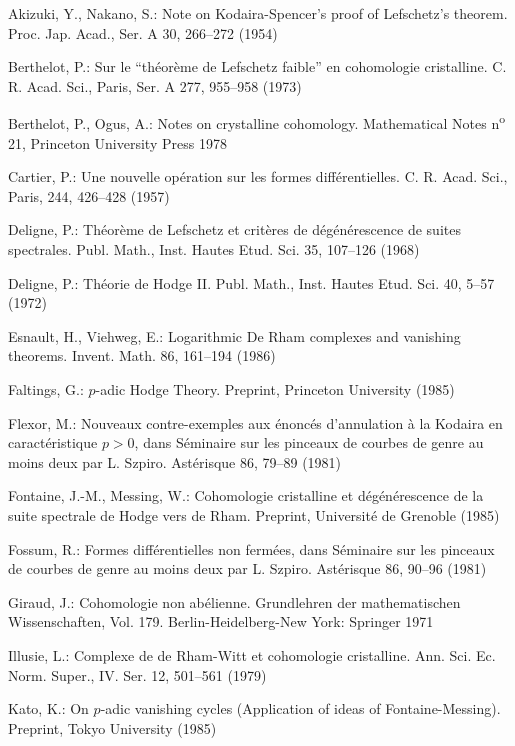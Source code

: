 \documentclass[10pt,reqno]{article}
\theoremstyle{plain}
\theoremstyle{definition}
\begin{document}
\begin{thebibliography}{28}
Akizuki, Y., Nakano, S.: Note on Kodaira-Spencer's proof of Lefschetz's theorem. Proc. Jap. Acad.,
Ser. A 30, 266--272 (1954)

Berthelot, P.: Sur le ``th{\'e}or{\`e}me de Lefschetz faible'' en cohomologie cristalline. C. R. Acad. Sci.,
Paris, Ser. A 277, 955--958 (1973)

Berthelot, P., Ogus, A.: Notes on crystalline cohomology. Mathematical Notes n\textsuperscript{o} 21, Princeton
University Press 1978

Cartier, P.: Une nouvelle op{\'e}ration sur les formes diff{\'e}rentielles. C. R. Acad. Sci., Paris, 244,
426--428 (1957)

Deligne, P.: Th{\'e}or{\`e}me de Lefschetz et crit{\`e}res de d{\'e}g{\'e}n{\'e}rescence de suites spectrales.
Publ. Math., Inst. Hautes Etud. Sci. 35, 107--126 (1968)

Deligne, P.: Th{\'e}orie de Hodge II. Publ. Math., Inst. Hautes Etud. Sci. 40, 5--57 (1972)

Esnault, H., Viehweg, E.: Logarithmic De Rham complexes and vanishing theorems. Invent. Math. 86, 161--194 (1986)

Faltings, G.: $p$-adic Hodge Theory. Preprint, Princeton University (1985)

Flexor, M.: Nouveaux contre-exemples aux {\'e}nonc{\'e}s d'annulation {\`a} la Kodaira en caract{\'e}ristique
$p>0$, dans S{\'e}minaire sur les pinceaux de courbes de genre au moins deux par L. Szpiro. Ast{\'e}risque
86, 79--89 (1981)

Fontaine, J.-M., Messing, W.: Cohomologie cristalline et d{\'e}g{\'e}n{\'e}rescence de la suite spectrale de
Hodge vers de Rham. Preprint, Universit{\'e} de Grenoble (1985)

Fossum, R.: Formes diff{\'e}rentielles non ferm{\'e}es, dans S{\'e}minaire sur les pinceaux de courbes de genre
au moins deux par L. Szpiro. Ast{\'e}risque 86, 90--96 (1981)

Giraud, J.: Cohomologie non ab{\'e}lienne. Grundlehren der mathematischen Wissenschaften, Vol. 179. Berlin-Heidelberg-New York:
Springer 1971

Illusie, L.: Complexe de de Rham-Witt et cohomologie cristalline. Ann. Sci. Ec. Norm. Super., IV. Ser. 12, 501--561 (1979)

Kato, K.: On $p$-adic vanishing cycles (Application of ideas of Fontaine-Messing). Preprint, Tokyo University (1985)


\end{thebibliography}
\end{document}
